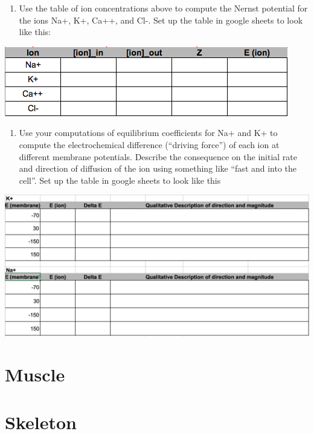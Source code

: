 \documentclass[]{book}
\providecommand{\tightlist}{%
  \setlength{\itemsep}{0pt}\setlength{\parskip}{0pt}}
\begin{document}
\begin{enumerate}
\def\labelenumi{\arabic{enumi}.}
\tightlist
\item
  Use the table of ion concentrations above to compute the Nernst
  potential for the ions Na+, K+, Ca++, and Cl-. Set up the table in
  google sheets to look like this:
\end{enumerate}

\includegraphics{images/nernst-output_table_1.png}

\begin{enumerate}
\def\labelenumi{\arabic{enumi}.}
\setcounter{enumi}{1}
\tightlist
\item
  Use your computations of equilibrium coefficients for Na+ and K+ to
  compute the electrochemical difference (``driving force'') of each ion
  at different membrane potentials. Describe the consequence on the
  initial rate and direction of diffusion of the ion using something
  like ``fast and into the cell''. Set up the table in google sheets to
  look like this
\end{enumerate}

\includegraphics{images/nernst-output_table_2.png}

\chapter{Muscle}\label{muscle}

\chapter{Skeleton}\label{skeleton}
\end{document}
